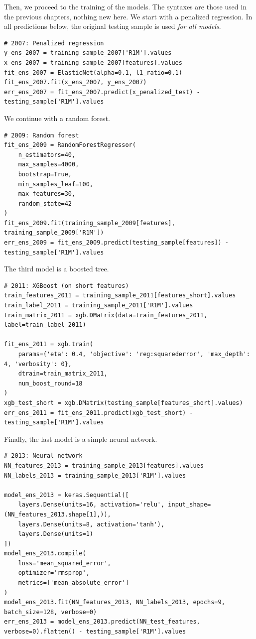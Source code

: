 Then, we proceed to the training of the models. The syntaxes are those used in the previous chapters, nothing new here. We start with a penalized regression. In all predictions below, the original testing sample is used \textit{for all models}.

\begin{verbatim}
# 2007: Penalized regression
y_ens_2007 = training_sample_2007['R1M'].values
x_ens_2007 = training_sample_2007[features].values
fit_ens_2007 = ElasticNet(alpha=0.1, l1_ratio=0.1)
fit_ens_2007.fit(x_ens_2007, y_ens_2007)
err_ens_2007 = fit_ens_2007.predict(x_penalized_test) - testing_sample['R1M'].values
\end{verbatim}

We continue with a random forest.

\begin{verbatim}
# 2009: Random forest
fit_ens_2009 = RandomForestRegressor(
    n_estimators=40,
    max_samples=4000,
    bootstrap=True,
    min_samples_leaf=100,
    max_features=30,
    random_state=42
)
fit_ens_2009.fit(training_sample_2009[features], training_sample_2009['R1M'])
err_ens_2009 = fit_ens_2009.predict(testing_sample[features]) - testing_sample['R1M'].values
\end{verbatim}

The third model is a boosted tree.

\begin{verbatim}
# 2011: XGBoost (on short features)
train_features_2011 = training_sample_2011[features_short].values
train_label_2011 = training_sample_2011['R1M'].values
train_matrix_2011 = xgb.DMatrix(data=train_features_2011, label=train_label_2011)

fit_ens_2011 = xgb.train(
    params={'eta': 0.4, 'objective': 'reg:squarederror', 'max_depth': 4, 'verbosity': 0},
    dtrain=train_matrix_2011,
    num_boost_round=18
)
xgb_test_short = xgb.DMatrix(testing_sample[features_short].values)
err_ens_2011 = fit_ens_2011.predict(xgb_test_short) - testing_sample['R1M'].values
\end{verbatim}

Finally, the last model is a simple neural network.

\begin{verbatim}
# 2013: Neural network
NN_features_2013 = training_sample_2013[features].values
NN_labels_2013 = training_sample_2013['R1M'].values

model_ens_2013 = keras.Sequential([
    layers.Dense(units=16, activation='relu', input_shape=(NN_features_2013.shape[1],)),
    layers.Dense(units=8, activation='tanh'),
    layers.Dense(units=1)
])
model_ens_2013.compile(
    loss='mean_squared_error',
    optimizer='rmsprop',
    metrics=['mean_absolute_error']
)
model_ens_2013.fit(NN_features_2013, NN_labels_2013, epochs=9, batch_size=128, verbose=0)
err_ens_2013 = model_ens_2013.predict(NN_test_features, verbose=0).flatten() - testing_sample['R1M'].values
\end{verbatim}


